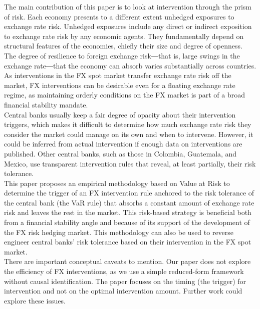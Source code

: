 \documentclass[11pt]{article}
\begin{document}
The main  contribution of this  paper is to  look at intervention  through the
prism of risk. Each economy presents  to a different extent unhedged exposures
to  exchange rate  risk. Unhedged  exposures  include any  direct or  indirect
exposition to  exchange rate risk  by any economic agents.  They fundamentally
depend on structural features of the  economies, chiefly their size and degree
of openness. The degree of resilience  to foreign exchange risk―that is, large
swings in the  exchange rate―that the economy can  absorb varies substantially
across countries.  As interventions  in the FX  spot market  transfer exchange
rate  risk off  the  market, FX  interventions  can be  desirable  even for  a
floating exchange  rate regime,  as maintaining orderly  conditions on  the FX
market is part of a broad financial stability mandate.\\

Central banks usually  keep a fair degree of opacity  about their intervention
triggers, which  makes it difficult to  determine how much exchange  rate risk
they   consider  the   market   could  manage   on  its   own   and  when   to
intervene. However,  it could be  inferred from actual intervention  if enough
data on  interventions are published.  Other  central banks, such as  those in
Colombia,   Guatemala,  and   Mexico,  use   transparent  intervention   rules
\citep{chamon2019} that reveal, at least partially, their risk tolerance.\\

This  paper proposes  an  empirical  methodology based  on  Value  at Risk  to
determine  the  trigger of  an  FX  intervention  rule  anchored to  the  risk
tolerance of the central bank (the VaR rule) that absorbs a constant amount of
exchange rate risk and leaves the rest in the market. This risk-based strategy
is beneficial both from a financial stability angle and because of its support
of the development of the FX risk hedging market. This methodology can also be
used  to  reverse  engineer  central  banks' risk  tolerance  based  on  their
intervention in the FX spot market.\\

There are important conceptual caveats to  mention. Our paper does not explore
the efficiency of FX interventions, as  we use a simple reduced-form framework
without causal identification.  The paper  focuses on the timing (the trigger)
for intervention  and not  on the optimal  intervention amount.   Further work
could explore these issues.\\
\end{document}

